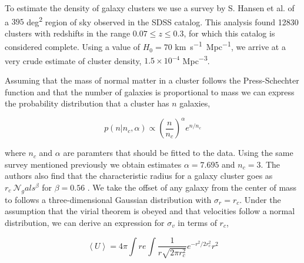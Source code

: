 To estimate the density of galaxy clusters we use a survey by S. Hansen et al. of a $395$ \si{deg^2} region of sky observed in the SDSS catalog. This analysis found 12830 clusters with redshifts in the range $0.07\leq z\leq 0.3$, for which this catalog is considered complete. Using a value of $H_0=70$ \si{km.s^{-1}.Mpc^{-1}}, we arrive at a very crude estimate of cluster density, $1.5\times 10^{-4}$ \si{Mpc^{-3}}.

Assuming that the mass of normal matter in a cluster follows the Press-Schechter function\cite{Press_1974} and that the number of galaxies is proportional to mass we can express the probability distribution that a cluster has $n$ galaxies,

\begin{equation}
p(n | n_c, \alpha) \propto \left( \frac{n}{n_c} \right)^{\alpha}e^{n/n_c}
\end{equation}

where $n_c$ and $\alpha$ are paramters that should be fitted to the data. Using the same survey mentioned previously we obtain estimates $\alpha = 7.695$ and $n_c = 3$. The authors also find that the characteristic radius for a galaxy cluster goes as $r_c ~ \mathcal{N}_gals^\beta$ for $\beta=0.56$ \cite{Hansen_2005}. We take the offset of any galaxy from the center of mass to follows a three-dimensional Gaussian distribution with $\sigma_r = r_c$. Under the assumption that the virial theorem is obeyed and that velocities follow a normal distribution, we can derive an expression for $\sigma_v$ in terms of $r_c$,

\begin{equation}
\left<U\right> = 4\pi \int re^{}
\int \frac{1}{r\sqrt{2\pi r_c^2}} e^{-r^2/2r_c^2} r^2
\end{equation}

